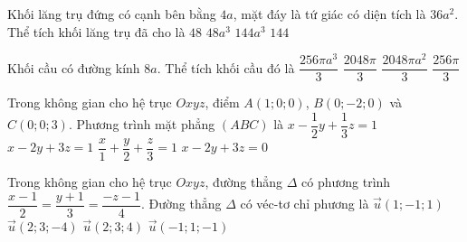 \begin{ex}%
	Khối lăng trụ đứng có cạnh bên bằng $4a$, mặt đáy là tứ giác có diện tích là $36a^2$. Thể tích khối lăng trụ đã cho là
	\choice
	{$48$}
	{$48a^3$}
	{\True $144a^3$}
	{$144$}
\end{ex}

\begin{ex}%
	Khối cầu có đường kính $8a$. Thể tích khối cầu đó là
	\choice
	{\True $\dfrac{256\pi a^3}{3}$}
	{$\dfrac{2048\pi}{3}$}
	{$\dfrac{2048\pi a^2}{3}$}
	{$\dfrac{256\pi}{3}$}
\end{ex}

\begin{ex}%
	Trong không gian cho hệ trục $Oxyz$, điểm $A(1;0;0)$, $B(0;-2;0)$ và $C(0;0;3)$. Phương trình mặt phẳng $(ABC)$ là
	\choice
	{\True $x-\dfrac{1}{2}y+\dfrac{1}{3}z=1$}
	{$x-2y+3z=1$}
	{$\dfrac{x}{1}+\dfrac{y}{2}+\dfrac{z}{3}=1$}
	{$x-2y+3z=0$}
\end{ex}

\begin{ex}%
	Trong không gian cho hệ trục $Oxyz$, đường thẳng $\Delta$ có phương trình $\dfrac{x-1}{2}=\dfrac{y+1}{3}=\dfrac{-z-1}{4}$. Đường thẳng $\Delta$ có véc-tơ chỉ phương là 
	\choice
	{$\overrightarrow{u}(1;-1; 1)$}
	{\True $\overrightarrow{u}(2; 3;-4)$}
	{$\overrightarrow{u}(2; 3; 4)$}
	{$\overrightarrow{u}(-1; 1;-1)$}
\end{ex}

